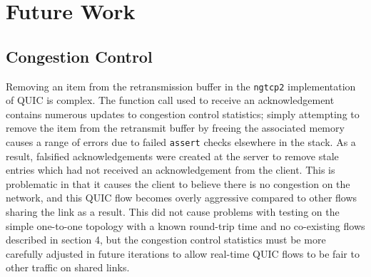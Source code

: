 \documentclass{mpaper}
\begin{document}
%
% 



\section{Future Work}

\subsection{Congestion Control}
Removing an item from the retransmission buffer in the \texttt{ngtcp2} implementation of QUIC is complex. The function call used to receive an acknowledgement contains numerous updates to congestion control statistics; simply attempting to remove the item from the retransmit buffer by freeing the associated memory causes a range of errors due to failed \texttt{assert} checks elsewhere in the stack. As a result, falsified acknowledgements were created at the server to remove stale entries which had not received an acknowledgement from the client. This is problematic in that it causes the client to believe there is no congestion on the network, and this QUIC flow becomes overly aggressive compared to other flows sharing the link as a result. This did not cause problems with testing on the simple one-to-one topology with a known round-trip time and no co-existing flows described in section 4, but the congestion control statistics must be more carefully adjusted in future iterations to allow real-time QUIC flows to be fair to other traffic on shared links.
\end{document}
